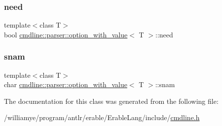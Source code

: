 \subsubsection{\texorpdfstring{need}{need}}
{\footnotesize\ttfamily template$<$class T$>$ \\
bool \mbox{\hyperlink{classcmdline_1_1parser_1_1option__with__value}{cmdline\+::parser\+::option\+\_\+with\+\_\+value}}$<$ T $>$\+::need\hspace{0.3cm}{\ttfamily [protected]}}

\mbox{\label{classcmdline_1_1parser_1_1option__with__value_a176bf293810fe0a9846585da1bef7ae5}} 
\subsubsection{\texorpdfstring{snam}{snam}}
{\footnotesize\ttfamily template$<$class T$>$ \\
char \mbox{\hyperlink{classcmdline_1_1parser_1_1option__with__value}{cmdline\+::parser\+::option\+\_\+with\+\_\+value}}$<$ T $>$\+::snam\hspace{0.3cm}{\ttfamily [protected]}}



The documentation for this class was generated from the following file\+:\begin{DoxyCompactItemize}
\item 
/williamye/program/antlr/erable/\+Erable\+Lang/include/\mbox{\hyperlink{cmdline_8h}{cmdline.\+h}}\end{DoxyCompactItemize}
